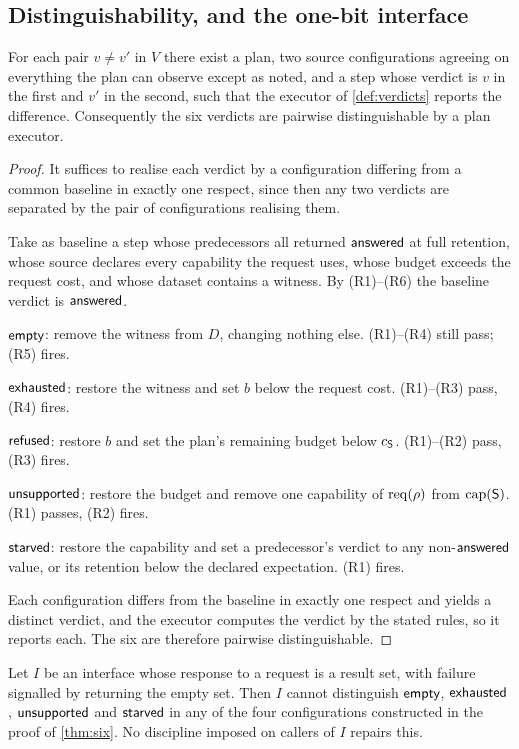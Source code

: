 \subsection{Distinguishability, and the one-bit interface}

\begin{theorem}
\label{thm:six}
For each pair $v \neq v'$ in $V$ there exist a plan, two source
configurations agreeing on everything the plan can observe except as noted, and
a step whose verdict is $v$ in the first and $v'$ in the second, such that the
executor of \cref{def:verdicts} reports the difference. Consequently the six
verdicts are pairwise distinguishable by a plan executor.
\end{theorem}

\begin{proof}
It suffices to realise each verdict by a configuration differing from a common
baseline in exactly one respect, since then any two verdicts are separated by
the pair of configurations realising them.

Take as baseline a step whose predecessors all returned $\textsf{answered}$ at full
retention, whose source declares every capability the request uses, whose
budget exceeds the request cost, and whose dataset contains a witness. By
(R1)--(R6) the baseline verdict is $\textsf{answered}$.

$\textsf{empty}$: remove the witness from $D$, changing nothing else. (R1)--(R4) still
pass; (R5) fires.

$\textsf{exhausted}$: restore the witness and set $b$ below the request cost. (R1)--(R3)
pass, (R4) fires.

$\textsf{refused}$: restore $b$ and set the plan's remaining budget below
$c_{\mathsf{S}}$. (R1)--(R2) pass, (R3) fires.

$\textsf{unsupported}$: restore the budget and remove one capability of $\mathrm{req}(\rho)$ from
$\mathrm{cap}(\mathsf{S})$. (R1) passes, (R2) fires.

$\textsf{starved}$: restore the capability and set a predecessor's verdict to any
non-$\textsf{answered}$ value, or its retention below the declared expectation. (R1) fires.

Each configuration differs from the baseline in exactly one respect and yields
a distinct verdict, and the executor computes the verdict by the stated rules,
so it reports each. The six are therefore pairwise distinguishable.
\end{proof}

\begin{corollary}
\label{cor:onebit}
Let $I$ be an interface whose response to a request is a result set, with
failure signalled by returning the empty set. Then $I$ cannot distinguish
$\textsf{empty}$, $\textsf{exhausted}$, $\textsf{unsupported}$ and $\textsf{starved}$ in any of the four configurations
constructed in the proof of \cref{thm:six}. No discipline imposed on callers of
$I$ repairs this.
\end{corollary}

